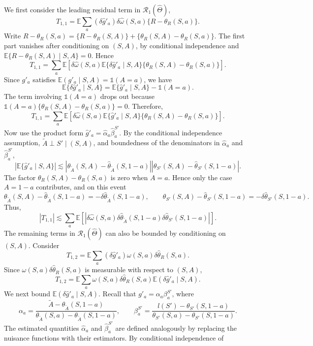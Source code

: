 \documentclass[12pt]{article}
\newcommand{\0}{\boldsymbol{0}}
\newcommand{\E}{\mathbb{E}}
\begin{document}
We first consider the leading residual term in \(\mathcal R_1(\widehat\Theta)\),
\[
T_{1,1}=\E\sum_a(\delta \widehat g'_a)\delta \widehat \omega(S,a)\{R-\theta_R(S,a)\}.
\]
Write \(R-\theta_R(S,a)=\{R-\theta_R(S,A)\}+\{\theta_R(S,A)-\theta_R(S,a)\}\). The first part vanishes after conditioning on \((S,A)\), by conditional independence and \(\E\{R-\theta_R(S,A)\mid S,A\}=0\). Hence
\[
T_{1,1}=\sum_a\E\left[\delta \widehat \omega(S,a)\E\{\delta \widehat g'_a\mid S,A\}\{\theta_R(S,A)-\theta_R(S,a)\}\right].
\]
Since \(g'_a\) satisfies \(\E(g'_a\mid S,A)=\mathds 1(A=a)\), we have
\[
\E\{\delta \widehat g'_a\mid S,A\}=\E\{\widehat g'_a\mid S,A\}-\mathds 1(A=a).
\]
The term involving \(\mathds 1(A=a)\) drops out because \(\mathds 1(A=a)\{\theta_R(S,A)-\theta_R(S,a)\}=0\). Therefore,
\[
T_{1,1}=\sum_a\E\left[\delta \widehat \omega(S,a)\E\{\widehat g'_a\mid S,A\}\{\theta_R(S,A)-\theta_R(S,a)\}\right].
\]
Now use the product form \(\widehat g'_a=\widehat\alpha_a\widehat\beta^{S'}_a\). By the conditional independence assumption, \(\widetilde A\perp S'\mid(S,A)\), and boundedness of the denominators in $\widehat\alpha_a$ and $\widehat\beta^{S'}_a$,
\[
|\E\{\widehat g'_a\mid S,A\}|\lesssim|\theta_{\widetilde A}(S,A)-\widehat\theta_{\widetilde A}(S,1-a)|
|\theta_{S'}(S,A)-\widehat\theta_{S'}(S,1-a)|.
\]
The factor \(\theta_R(S,A)-\theta_R(S,a)\) is zero when \(A=a\). Hence only the case \(A=1-a\) contributes, and on this event
\[
\theta_{\widetilde A}(S,A)-\widehat\theta_{\widetilde A}(S,1-a)=-\delta \widehat \theta_{\widetilde A}(S,1-a),\qquad\theta_{S'}(S,A)-\widehat\theta_{S'}(S,1-a)=-\delta \widehat \theta_{S'}(S,1-a).
\]
Thus,
\[
|T_{1,1}|\lesssim\sum_a\E\left[|\delta \widehat \omega(S,a)\delta \widehat \theta_{\widetilde A}(S,1-a)\delta \widehat \theta_{S'}(S,1-a)|\right].
\]
The remaining terms in \(\mathcal R_1(\widehat\Theta)\) can also be bounded by conditioning on \((S,A)\). Consider
\[
T_{1,2}=\E\sum_a(\delta \widehat g'_a)\omega(S,a)\delta \widehat \theta_R(S,a).
\]
Since \(\omega(S,a)\delta \widehat \theta_R(S,a)\) is measurable with respect to \((S,A)\),
\[
T_{1,2}=\E\sum_a\omega(S,a)\delta \widehat \theta_R(S,a)\E(\delta \widehat g'_a\mid S,A).
\]
We next bound \(\E(\delta \widehat g'_a\mid S,A)\). Recall that \(g'_a=\alpha_a\beta^{S'}_a\), where
\[
\alpha_a=\frac{\widetilde A-\theta_{\widetilde A}(S,1-a)}{\theta_{\widetilde A}(S,a)-\theta_{\widetilde A}(S,1-a)},\qquad\beta^{S'}_a=\frac{l(S')-\theta_{S'}(S,1-a)}{\theta_{S'}(S,a)-\theta_{S'}(S,1-a)}.
\]
The estimated quantities \(\widehat\alpha_a\) and \(\widehat\beta^{S'}_a\) are defined analogously by replacing the nuisance functions with their estimators. By conditional independence of
\end{document}
